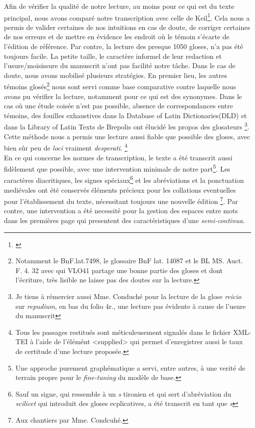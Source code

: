 \documentclass[a4paper, twoside, 12pt]{book}
\begin{document}
Afin de vérifier la qualité de notre lecture, au moins pour ce qui est du texte principal, nous avons comparé notre transcription avec celle de Keil\footnote{\cite{keil1857grammatici}}. Cela nous a permis de valider certaines de nos intuitions en cas de doute, de corriger certaines de nos erreurs et de mettre en évidence les endroit où le témoin s'écarte de l'édition de référence. Par contre, la lecture des presque 1050 gloses, n'a pas été toujours facile. La petite taille, le caractère informel de leur redaction et l'usure/moisissure du manuscrit n'ont pas facilité notre tâche. Dans le cas de doute, nous avons mobilisé plusieurs stratégies. En premier lieu, les autres témoins glosés\footnote{Notamment le BnF.lat.7498, le glossaire BnF lat. 14087 et le BL MS. Auct. F. 4. 32 avec qui VLO41 partage une bonne partie des gloses et dont l'écriture, très lisible ne laisse pas des doutes sur la lecture.} nous sont servi comme base comparative contre laquelle nous avons pu vérifier la lecture, notamment pour ce qui est des synonymes. Dans le cas où une étude coisée n'est pas possible, absence de correspondances entre témoins, des fouilles exhaustives dans la Database of Latin Dictionaries(DLD) et dans la Library of Latin Texts de Brepolis ont élucidé les propos des glosateurs \footnote{Je tiens à rémercier aussi Mme. Conduché pour la lecture de la glose \textit{reicio} sur \textit{repudium}, en bas du folio 4r., une lecture pas évidente à cause de l'usure du manuscrit}. Cette méthode nous a permis une lecture aussi fiable que possible des gloses,  avec bien sûr peu de \textit{loci} vraiment \textit{desperati}. \footnote{Tous les passages restitués sont méticuleusement signalés dans le fichier XML-TEI à l'aide de l'élémént <supplied> qui permet d'enregistrer aussi le taux de certitude d'une lecture proposée.} \\

En ce qui concerne les normes de transcription, le texte a été transcrit aussi fidèlement que possible, avec une intervention minimale de notre part\footnote{Une approche purement graphématique a servi, entre autres, à une verité de terrain propre pour le \textit{fine-tuning} du modèle de base.}. Les caractères diacritiques, les signes spéciaux\footnote{Sauf un signe, qui ressemble à un \textit{s} tironien et qui sert d'abréviation du \textit{scilicet} qui introduit des gloses ecplicatives, a été transcrit en tant que \textit{s}} et les abréviations et la ponctuation mediévales ont été conservés éléments précieux pour les collations eventuelles pour l'établissement du texte, nécessitant toujours une nouvelle édition \footnote{Aux chantiers par Mme. Condcuhé.}. Par contre, une intervention a été necessité pour la gestion des espaces entre mots dans les premières page qui presentent des caractéristiques d'une \textit{semi-continua}.\\
\end{document}
